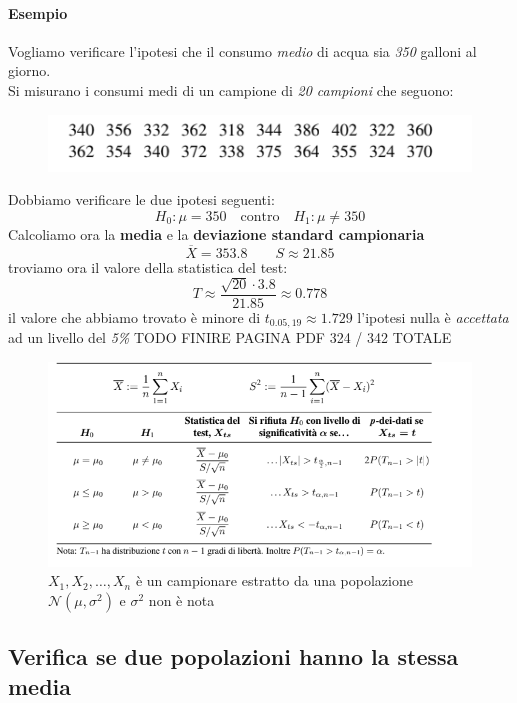 \documentclass[]{article}
\begin{document}
    \paragraph{Esempio} Vogliamo verificare l'ipotesi che il consumo \textit{medio} di acqua sia \textit{350} galloni al giorno. \\
    Si misurano i consumi medi di un campione di \textit{20 campioni} che seguono:
    \begin{figure}[H]
        \includegraphics[width=\textwidth]{images/boh_8.png}
    \end{figure}
    Dobbiamo verificare le due ipotesi seguenti:
    \[ H_0 : \mu = 350 \quad \text{contro} \quad H_1 : \mu \not = 350 \]
    Calcoliamo ora la \textbf{media} e la \textbf{deviazione standard campionaria}
    \[ \overline{X} = 353.8 \qquad S \approx 21.85 \]
    troviamo ora il valore della statistica del test:
    \[ T \approx \frac{\sqrt{20} \cdot 3.8}{21.85} \approx 0.778 \]
    il valore che abbiamo trovato è minore di $t_{0.05, 19} \approx 1.729$ l'ipotesi nulla è \textit{accettata} ad un livello del \textit{5\%}
    TODO FINIRE PAGINA PDF 324 / 342 TOTALE
    \begin{figure}[H]
        \caption{$X_1, X_2, \ldots, X_n$ è un campionare estratto da una popolazione $\mathcal{N}(\mu, \sigma^2)$ e $\sigma^2$ non è nota}
        \includegraphics[width=\textwidth]{images/boh_9.png}
    \end{figure}
    \subsection{Verifica se due popolazioni hanno la stessa media}
\end{document}
